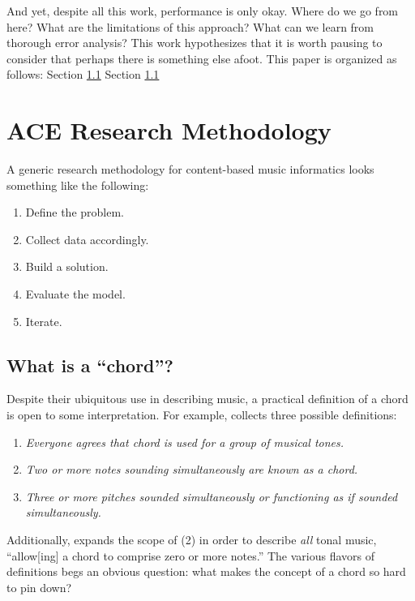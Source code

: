 \documentclass{article}
\begin{document}
And yet, despite all this work, performance is only okay.
Where do we go from here?
What are the limitations of this approach?
What can we learn from thorough error analysis?
This work hypothesizes that it is worth pausing to consider that perhaps there is something else afoot.
This paper is organized as follows:
Section \ref{}
Section \ref{}


\section{ACE Research Methodology}

A generic research methodology for content-based music informatics looks something like the following:

\begin{enumerate}
\item Define the problem.
\item Collect data accordingly.
\item Build a solution.
\item Evaluate the model.
\item Iterate.
\end{enumerate}


\subsection{What is a ``chord''?}

Despite their ubiquitous use in describing music, a practical definition of a chord is open to some interpretation.
For example, \cite{McVicar2013Machine} collects three possible definitions:

\begin{enumerate}
\item \emph{Everyone agrees that \emph{chord} is used for a group of musical tones.}
\item \emph{Two or more notes sounding simultaneously are known as a chord.}
\item \emph{Three or more pitches sounded simultaneously or functioning as if sounded simultaneously.}
\end{enumerate}

\noindent Additionally, \cite{Harte2010Towards} expands the scope of (2) in order to describe \emph{all} tonal music, ``allow[ing] a chord to comprise zero or more notes.''
The various flavors of definitions begs an obvious question:
what makes the concept of a chord so hard to pin down?
\end{document}

